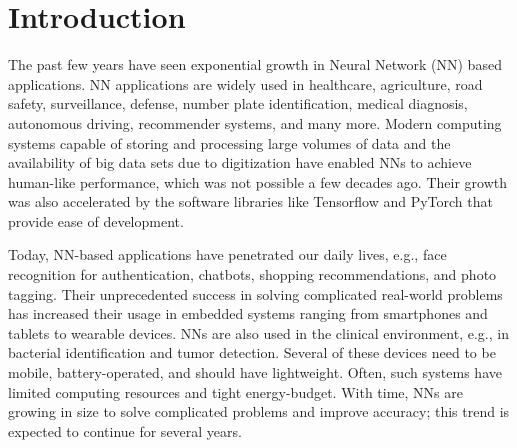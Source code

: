 \graphicspath{{./Ch1-Introduction/images/}}

\chapter{Introduction} \label{chap:introduction}
\begin{comment}
//clearly come out what are you doing in this thesis and what are the contributions
//what field you are targetting, scope and motivation, what problems, to justify your contributions.
1. About AI/ML/NN/DNNs: Applications, Domains, Growth, Type of NNs, Training and inference, 

2. Modern DNNs, architectures and popular NNs

3. Example: Number of computations, parameters: Illustrate compute and memory intensive operations.
Number of layer

4. Edge vs. Cloud Computing. 

5. Edge AI Challenges

6. About the Architectures for Edge AI Accelerators: Give wider scope of these architectures, and specific type of architectures. Trade-offs.

7. Performance bottlenecks for edge AI: Memory and Throughput bottlenecks.
Memory accesses are the key botllenecks for these edge AI devices. 

6. Summary and Outline of the Thesis.

\end{comment}

The past few years have seen exponential growth in Neural Network (NN) based applications. NN applications are widely used in healthcare, agriculture, road safety, surveillance, defense, number plate identification, medical diagnosis, autonomous driving, recommender systems, and many more. Modern computing systems capable of storing and processing large volumes of data and the availability of big data sets due to digitization have enabled NNs to achieve human-like performance, which was not possible a few decades ago. Their growth was also accelerated by the software libraries like Tensorflow and PyTorch that provide ease of development.

Today, NN-based applications have penetrated our daily lives, e.g., face recognition for authentication, chatbots, shopping recommendations, and photo tagging. Their unprecedented success in solving complicated real-world problems has increased their usage in embedded systems ranging from smartphones and tablets to wearable devices. NNs are also used in the clinical environment, e.g., in bacterial identification and tumor detection. Several of these devices need to be mobile, battery-operated, and should have lightweight. Often, such systems have limited computing resources and tight energy-budget. With time, NNs are growing in size to solve complicated problems and improve accuracy; this trend is expected to continue for several years.  

